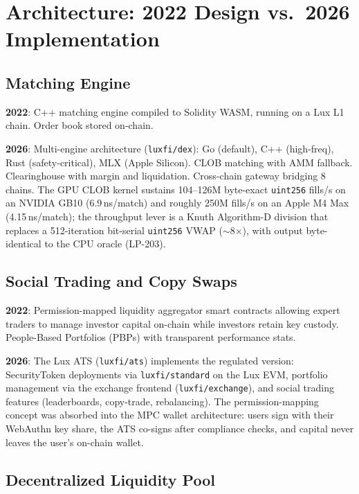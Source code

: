 \section{Architecture: 2022 Design vs.\ 2026 Implementation}


\subsection{Matching Engine}

\textbf{2022}: C++ matching engine compiled to Solidity WASM,
running on a Lux L1 chain. Order book stored on-chain.

\textbf{2026}: Multi-engine architecture
(\texttt{luxfi/dex}): Go (default), C++ (high-freq), Rust
(safety-critical), MLX (Apple Silicon). CLOB matching with
AMM fallback. Clearinghouse with margin and liquidation.
Cross-chain gateway bridging 8 chains. The GPU CLOB kernel
sustains 104--126M byte-exact \texttt{uint256} fills/s on an NVIDIA
GB10 (6.9\,ns/match) and roughly 250M fills/s on an Apple M4 Max
(4.15\,ns/match); the throughput lever is a Knuth Algorithm-D
division that replaces a 512-iteration bit-serial \texttt{uint256}
VWAP ($\sim$8$\times$), with output byte-identical to the CPU
oracle (LP-203).

\subsection{Social Trading and Copy Swaps}

\textbf{2022}: Permission-mapped liquidity aggregator smart
contracts allowing expert traders to manage investor capital
on-chain while investors retain key custody. People-Based
Portfolios (PBPs) with transparent performance stats.

\textbf{2026}: The Lux ATS (\texttt{luxfi/ats}) implements the
regulated version: SecurityToken deployments via \texttt{luxfi/standard}
on the Lux EVM, portfolio management via the exchange frontend
(\texttt{luxfi/exchange}), and social trading features
(leaderboards, copy-trade, rebalancing). The permission-mapping
concept was absorbed into the MPC wallet architecture: users
sign with their WebAuthn key share, the ATS co-signs after
compliance checks, and capital never leaves the user's
on-chain wallet.

\subsection{Decentralized Liquidity Pool}

